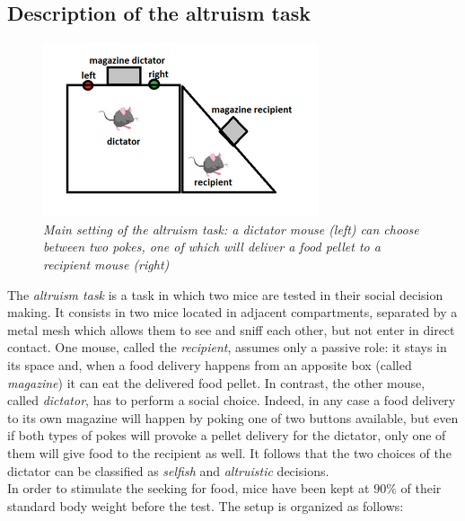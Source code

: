 \documentclass[a4paper]{article}
\begin{document}
\subsection{Description of the altruism task}

\begin{figure}[H]
	\begin{center}
		\includegraphics[scale=1.1]{altruism.png} 
	\end{center} 
	\caption{\textit{Main setting of the altruism task: a dictator mouse (left) can choose between two pokes, one of which will deliver a food pellet to a recipient mouse (right)}}
	
\end{figure}

The \textit{altruism task} is a task in which two mice are tested in their social decision making. It consists in two mice located in adjacent compartments, separated by a metal mesh which allows them to see and sniff each other, but not enter in direct contact. One mouse, called the \textit{recipient}, assumes only a passive role: it stays in its space and, when a food delivery happens from an apposite box (called \textit{magazine}) it can eat the delivered food pellet. 
In contrast, the other mouse, called \textit{dictator}, has to perform a social choice. Indeed, in any case a food delivery to its own magazine will happen by poking one of two buttons available, but even if both types of pokes will provoke a pellet delivery for the dictator, only one of them will give food to the recipient as well. It follows that the two choices of the dictator can be classified as \textit{selfish} and \textit{altruistic} decisions.\\
In order to stimulate the seeking for food, mice have been kept at $ 90 \%$ of their standard body weight before the test. The setup is organized as follows:
\end{document}
